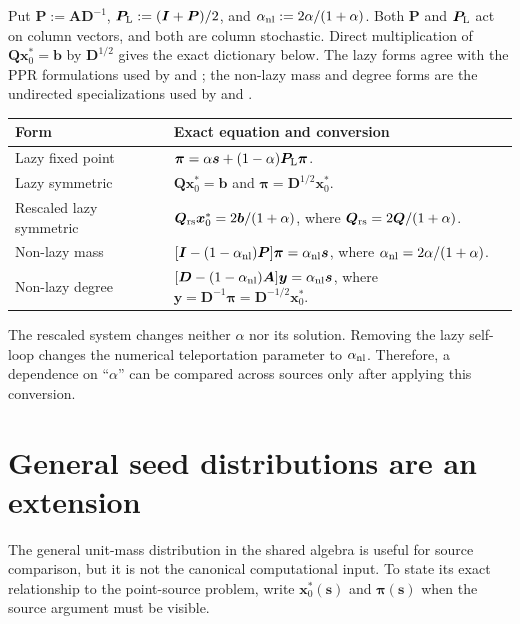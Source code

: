 \documentclass[11pt]{article}
\begin{document}
Put $\bm{P}:=\bm{A}\bm{D}^{-1}$,
$\bm{P}_{\rm L}:=(\bm{I}+\bm{P})/2$, and
$\alpha_{\rm nl}:=2\alpha/(1+\alpha)$.
Both $\bm{P}$ and $\bm{P}_{\rm L}$ act on column vectors, and both are
column stochastic. Direct multiplication of
$\bm{Q}\bm{x}_0^*=\bm{b}$ by $\bm{D}^{1/2}$ gives the exact dictionary below.
The lazy forms agree with the PPR formulations used by
\citet{zhou2024iterative} and \citet{huang2025accelerated}; the non-lazy mass
and degree forms are the undirected specializations used by
\citet{chen2023accelerating} and \citet{wei2026simple}.

\begin{center}
\begin{tabularx}{0.97\textwidth}{@{}
    >{\raggedright\arraybackslash}p{}
    >{\raggedright\arraybackslash}X@{}}
\toprule
Form & Exact equation and conversion \\\midrule
Lazy fixed point
& $\bm{\pi}=\alpha \bm{s}
   +(1-\alpha)\bm{P}_{\rm L}\bm{\pi}$. \\\midrule
Lazy symmetric
& $\bm{Q}\bm{x}_0^*=\bm{b}$ and
  $\bm{\pi}=\bm{D}^{1/2}\bm{x}_0^*$. \\\midrule
Rescaled lazy symmetric
& $\bm{Q}_{\rm rs}\bm{x}_0^* = 2\bm{b}/(1+\alpha)$, where
  $\bm{Q}_{\rm rs}=2\bm{Q}/(1+\alpha)$. \\\midrule
Non-lazy mass
& $[\bm{I}-(1-\alpha_{\rm nl})\bm{P}]\bm{\pi}
   =\alpha_{\rm nl}\bm{s}$, where
  $\alpha_{\rm nl}=2\alpha/(1+\alpha)$. \\\midrule
Non-lazy degree
& $[\bm{D}-(1-\alpha_{\rm nl})\bm{A}]\bm{y}
   =\alpha_{\rm nl}\bm{s}$, where
  $\bm{y}=\bm{D}^{-1}\bm{\pi}
   =\bm{D}^{-1/2}\bm{x}_0^*$. \\\bottomrule
\end{tabularx}
\end{center}

The rescaled system changes neither $\alpha$ nor its solution.  Removing the
lazy self-loop changes the numerical teleportation parameter to
$\alpha_{\rm nl}$.  Therefore, a dependence on ``$\alpha$'' can be compared
across sources only after applying this conversion.

\section{General seed distributions are an extension}
\label{sec:problem-definitions-general-seed-extension}

The general unit-mass distribution in the shared algebra is useful for source
comparison, but it is not the canonical computational input.  To state its
exact relationship to the point-source problem, write
$\bm{x}_0^*(\bm{s})$ and $\bm{\pi}(\bm{s})$ when the source argument must be
visible.
\end{document}
